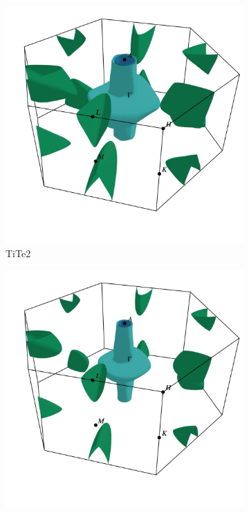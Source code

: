 \begin{figure}[H]
\centering
	\begin{subfigure}[b]{.4\textwidth}
    	\includegraphics[width=\linewidth]{img/results/fstite2.pdf}
    	\caption{TiTe2}
	\end{subfigure}
	\begin{subfigure}[b]{.4\textwidth}
    	\includegraphics[width=\linewidth]{img/results/fstise2.pdf}

\end{subfigure}
\end{figure}
